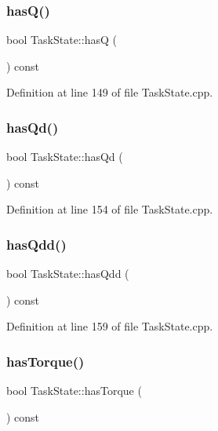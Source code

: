 \subsubsection{\texorpdfstring{has\+Q()}{hasQ()}}
{\footnotesize\ttfamily bool Task\+State\+::hasQ (\begin{DoxyParamCaption}{ }\end{DoxyParamCaption}) const}



Definition at line 149 of file Task\+State.\+cpp.

\hypertarget{classocra_1_1TaskState_aeb4c2c7b03a9f5fa36a63043c6eb1dd5}{}\label{classocra_1_1TaskState_aeb4c2c7b03a9f5fa36a63043c6eb1dd5} 
\subsubsection{\texorpdfstring{has\+Qd()}{hasQd()}}
{\footnotesize\ttfamily bool Task\+State\+::has\+Qd (\begin{DoxyParamCaption}{ }\end{DoxyParamCaption}) const}



Definition at line 154 of file Task\+State.\+cpp.

\hypertarget{classocra_1_1TaskState_a072110d094ace71841b284f77202eeb0}{}\label{classocra_1_1TaskState_a072110d094ace71841b284f77202eeb0} 
\subsubsection{\texorpdfstring{has\+Qdd()}{hasQdd()}}
{\footnotesize\ttfamily bool Task\+State\+::has\+Qdd (\begin{DoxyParamCaption}{ }\end{DoxyParamCaption}) const}



Definition at line 159 of file Task\+State.\+cpp.

\hypertarget{classocra_1_1TaskState_a994d367f5b29c37b9c68fb7aa7b2fc43}{}\label{classocra_1_1TaskState_a994d367f5b29c37b9c68fb7aa7b2fc43} 
\subsubsection{\texorpdfstring{has\+Torque()}{hasTorque()}}
{\footnotesize\ttfamily bool Task\+State\+::has\+Torque (\begin{DoxyParamCaption}{ }\end{DoxyParamCaption}) const}



